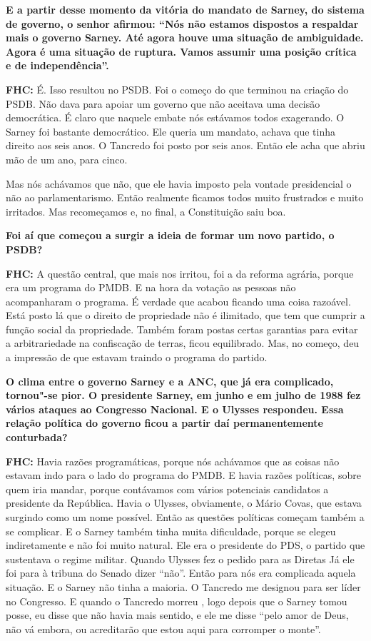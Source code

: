 \textbf{E a partir desse momento da vitória do mandato de Sarney, do
sistema de governo, o senhor afirmou: ``Nós não estamos dispostos a
respaldar mais o governo Sarney. Até agora houve uma situação de
ambiguidade. Agora é uma situação de ruptura. Vamos assumir uma posição
crítica e de independência''.}

\textbf{FHC:} É. Isso resultou no PSDB. Foi o começo do que terminou na
criação do PSDB. Não dava para apoiar um governo que não aceitava uma
decisão democrática. É claro que naquele embate nós estávamos todos
exagerando. O Sarney foi bastante democrático. Ele queria um mandato,
achava que tinha direito aos seis anos. O Tancredo foi posto por seis
anos. Então ele acha que abriu mão de um ano, para cinco.

Mas nós achávamos que não, que ele havia imposto pela vontade
presidencial o não ao parlamentarismo. Então realmente ficamos todos
muito frustrados e muito irritados. Mas recomeçamos e, no final, a
Constituição saiu boa.

\textbf{Foi aí que começou a surgir a ideia de formar um novo partido, o
PSDB?}

\textbf{FHC:} A questão central, que mais nos irritou, foi a da reforma
agrária, porque era um programa do PMDB. E na hora da votação as pessoas
não acompanharam o programa. É verdade que acabou ficando uma coisa
razoável. Está posto lá que o direito de propriedade não é ilimitado,
que tem que cumprir a função social da propriedade. Também foram postas
certas garantias para evitar a arbitrariedade na confiscação de terras,
ficou equilibrado. Mas, no começo, deu a impressão de que estavam
traindo o programa do partido.

\textbf{O clima entre o governo Sarney e a ANC, que já era complicado,
tornou"-se pior. O presidente Sarney, em junho e em julho de 1988 fez
vários ataques ao Congresso Nacional. E o Ulysses respondeu. Essa
relação política do governo ficou a partir daí permanentemente
conturbada?}

\textbf{FHC:} Havia razões programáticas, porque nós achávamos que as
coisas não estavam indo para o lado do programa do PMDB. E havia razões
políticas, sobre quem iria mandar, porque contávamos com vários
potenciais candidatos a presidente da República. Havia o Ulysses,
obviamente, o Mário Covas, que estava surgindo como um nome possível.
Então as questões políticas começam também a se complicar. E o Sarney
também tinha muita dificuldade, porque se elegeu indiretamente e não foi
muito natural. Ele era o presidente do PDS, o partido que sustentava o
regime militar. Quando Ulysses fez o pedido para as Diretas Já ele foi
para à tribuna do Senado dizer ``não''. Então para nós era complicada
aquela situação. E o Sarney não tinha a maioria. O Tancredo me designou
para ser líder no Congresso. E quando o Tancredo morreu , logo depois
que o Sarney tomou posse, eu disse que não havia mais sentido, e ele me
disse ``pelo amor de Deus, não vá embora, ou acreditarão que estou aqui
para corromper o monte''.

